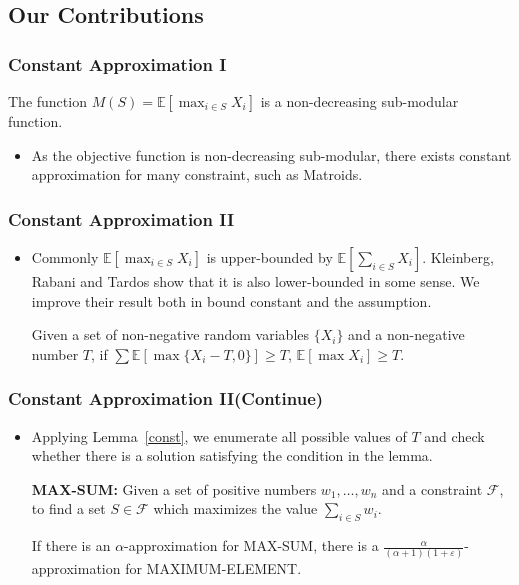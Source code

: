 \documentclass[serif,envcountsect]{beamer}
\newcommand{\calF}{{\mathcal F}}
\newcommand{\Exp}{{\mathbb{E}}}
\begin{document}
\subsection{Our Contributions}
\begin{frame}\frametitle{Constant Approximation I}
\begin{lemma}
The function $M(S) = \Exp[\max_{i\in S} X_i]$ is a non-decreasing sub-modular function.
\end{lemma}
\begin{itemize}
\item As the objective function is non-decreasing sub-modular, there exists constant approximation for many constraint, such as Matroids.
\end{itemize}
\end{frame}

\begin{frame}\frametitle{Constant Approximation II}
\begin{itemize}
\item Commonly $\Exp[\max_{i\in S} X_i]$ is upper-bounded by $\Exp[\sum_{i\in S} X_i]$. Kleinberg, Rabani and Tardos show that it is also lower-bounded in some sense. We improve their result both in bound constant and the assumption.
\begin{lemma}
\label{const}
Given a set of non-negative random variables $\{X_i\}$ and a non-negative number $T$, if $\sum \Exp[\max\{X_i - T, 0\}] \geq T$, $\Exp[\max X_i] \geq T$.
\end{lemma}
\end{itemize}
\end{frame}

\begin{frame}\frametitle{Constant Approximation II(Continue)}
\begin{itemize}
\item Applying Lemma~\ref{const}, we enumerate all possible values of $T$ and check whether there is a solution satisfying the condition in the lemma. 
\begin{problem}\textbf{MAX-SUM:}
Given a set of positive numbers $w_1, \ldots, w_n$ and a constraint $\calF$, to find a set $S\in \calF$ which maximizes the value $\sum_{i\in S} w_i$.
\end{problem}
\begin{theorem}
If there is an $\alpha$-approximation for MAX-SUM, there is a $\frac{\alpha}{(\alpha+1)(1+\varepsilon)}$-approximation for MAXIMUM-ELEMENT.
\end{theorem}
\end{itemize}
\end{frame}
\end{document}
